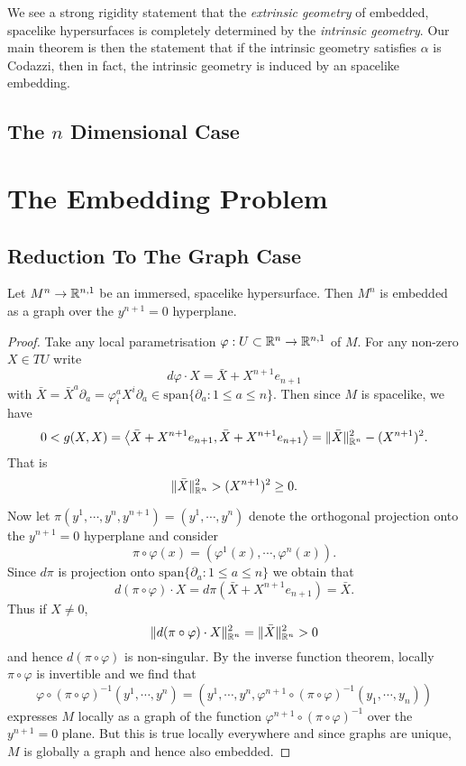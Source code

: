\documentclass[a4paper, 12pt]{amsart}
\begin{document}
\begin{rem}
We see a strong rigidity statement that the \emph{extrinsic geometry} of embedded, spacelike hypersurfaces is completely determined by the \emph{intrinsic geometry}. Our main theorem is then the statement that if the intrinsic geometry satisfies \(\alpha\) is Codazzi, then in fact, the intrinsic geometry is induced by an spacelike embedding.
\end{rem}

\subsection{The \(n\) Dimensional Case}
\label{subsec:notation_ndim}
\section{The Embedding Problem}
\label{sec:embedding}

\subsection{Reduction To The Graph Case}
\label{subsec:embedding_graph}

\begin{lemma}
\label{lem:graph}

Let \(M^n \to \mathbb{R}^{n,1}\) be an immersed, spacelike hypersurface. Then \(M^n\) is embedded as a graph over the \(y^{n+1} = 0\) hyperplane.
\end{lemma}

\begin{proof}
Take any local parametrisation \(\varphi : U \subset \mathbb{R}^n \to \mathbb{R}^{n,1}\) of \(M\). For any non-zero \(X \in TU\) write
\[
d\varphi \cdot X = \bar{X} + X^{n+1} e_{n+1}
\]
with \(\bar{X} = \bar{X}^a \partial_a = \varphi^a_i X^i \partial_a \in \text{span} \{\partial_a : 1 \leq a \leq n\}\). Then since \(M\) is spacelike, we have
\[
0 < g(X, X) = \left\langle \bar{X} + X^{n+1} e_{n+1},\bar{X} + X^{n+1} e_{n+1} \right\rangle = \|\bar{X}\|_{\mathbb{R}^n}^2 - (X^{n+1})^2.
\]
That is
\[
\|\bar{X}\|_{\mathbb{R}^n}^2 > (X^{n+1})^2 \geq 0.
\]

Now let \(\pi(y^1, \cdots, y^n, y^{n+1}) = (y^1, \cdots, y^n)\) denote the orthogonal projection onto the \(y^{n+1} = 0\) hyperplane and consider
\[
\pi \circ \varphi (x) = (\varphi^1(x), \cdots, \varphi^n(x)).
\]
Since \(d \pi\) is projection onto \(\text{span} \{\partial_a : 1 \leq a \leq n\}\) we obtain that
\[
d(\pi \circ \varphi) \cdot X = d\pi (\bar{X} + X^{n+1} e_{n+1}) = \bar{X}.
\]
Thus if \(X \ne 0\),
\[
\|d(\pi \circ \varphi) \cdot X\|_{\mathbb{R}^n}^2 = \|\bar{X}\|_{\mathbb{R}^n}^2 > 0
\]
and hence \(d(\pi \circ \varphi)\) is non-singular. By the inverse function theorem, locally \(\pi \circ \varphi\) is invertible and we find that
\[
\varphi \circ (\pi \circ \varphi)^{-1} (y^1, \cdots, y^n) = (y^1, \cdots, y^n, \varphi^{n+1} \circ (\pi \circ \varphi)^{-1} (y_1, \cdots, y_n))
\]
expresses \(M\) locally as a graph of the function \(\varphi^{n+1} \circ (\pi \circ \varphi)^{-1}\) over the \(y^{n+1} = 0\) plane. But this is true locally everywhere and since graphs are unique, \(M\) is globally a graph and hence also embedded.
\end{proof}
\end{document}
